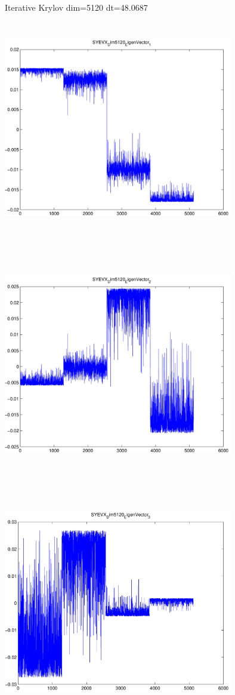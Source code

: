 \documentclass[9pt]{article}
\theoremstyle{plain}
\theoremstyle{definition}
\theoremstyle{remark}
\numberwithin{equation}{section}
\begin{document}
Iterative Krylov dim=5120 dt=48.0687
\includegraphics[width=10.0cm,height=10.0cm]{SYEVX_Dim5120_EigenVector_1.pdf}

\includegraphics[width=10.0cm,height=10.0cm]{SYEVX_Dim5120_EigenVector_2.pdf}

\includegraphics[width=10.0cm,height=10.0cm]{SYEVX_Dim5120_EigenVector_3.pdf}
\end{document}
